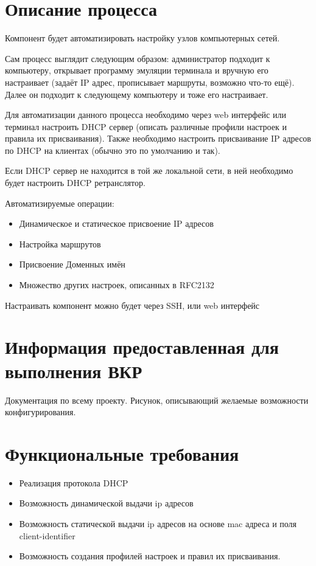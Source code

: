 \documentclass[12pt]{article}
\begin{document}
\section{Описание процесса}
Компонент будет автоматизировать настройку узлов компьютерных сетей.

Сам процесс выглядит следующим образом:
администратор подходит к компьютеру, открывает программу эмуляции терминала и вручную его настраивает (задаёт IP адрес, прописывает маршруты, возможно что-то ещё). Далее он подходит к следующему компьютеру и тоже его настраивает.

Для автоматизации данного процесса необходимо через web интерфейс или терминал настроить DHCP сервер (описать различные профили настроек и правила их присваивания). Также необходимо настроить присваивание IP адресов по DHCP на клиентах (обычно это по умолчанию и так).

Если DHCP сервер не находится в той же локальной сети, в ней необходимо будет настроить DHCP ретранслятор.


Автоматизируемые операции:
\begin{itemize}
    \item Динамическое и статическое присвоение IP адресов
    \item Настройка маршрутов
    \item Присвоение Доменных имён
    \item Множество других настроек, описанных в RFC2132
\end{itemize}

Настраивать компонент можно будет через SSH, или web интерфейс

\section{Информация предоставленная для выполнения ВКР}
Документация по всему проекту.
Рисунок, описывающий желаемые возможности конфигурирования.

\section{Функциональные требования}
\begin{itemize}
    \item Реализация протокола DHCP
    \item Возможность динамической выдачи ip адресов
    \item Возможность статической выдачи ip адресов на основе mac адреса и поля client-identifier
    \item Возможность создания профилей настроек и правил их присваивания.
\end{itemize}
    
\end{document}
